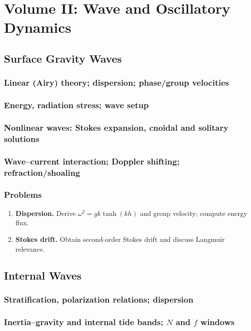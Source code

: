 \documentclass[12pt]{book}
\begin{document}
\part{Volume II: Wave and Oscillatory Dynamics}

\chapter{Surface Gravity Waves}
\section{Linear (Airy) theory; dispersion; phase/group velocities}
\section{Energy, radiation stress; wave setup}
\section{Nonlinear waves: Stokes expansion, cnoidal and solitary solutions}
\section{Wave--current interaction; Doppler shifting; refraction/shoaling}
\section*{Problems}
\begin{enumerate}
  \item \textbf{Dispersion.} Derive $\omega^2 = gk \tanh(kh)$ and group velocity; compute energy flux.
  \item \textbf{Stokes drift.} Obtain second-order Stokes drift and discuss Langmuir relevance.
\end{enumerate}

\chapter{Internal Waves}
\section{Stratification, polarization relations; dispersion}
\section{Inertia--gravity and internal tide bands; $N$ and $f$ windows}
\end{document}
